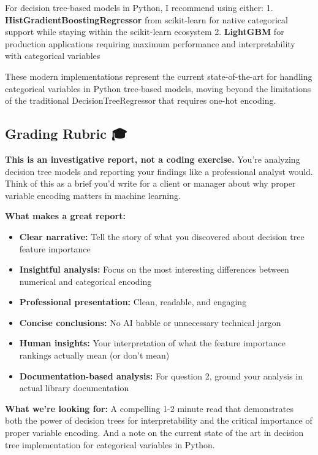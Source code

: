 \documentclass[
  letterpaper,
  DIV=11,
  numbers=noendperiod]{scrartcl}
\providecommand{\tightlist}{%
  \setlength{\itemsep}{0pt}\setlength{\parskip}{0pt}}
\begin{document}
For decision tree-based models in Python, I recommend using either: 1.
\textbf{HistGradientBoostingRegressor} from scikit-learn for native
categorical support while staying within the scikit-learn ecosystem 2.
\textbf{LightGBM} for production applications requiring maximum
performance and interpretability with categorical variables

These modern implementations represent the current state-of-the-art for
handling categorical variables in Python tree-based models, moving
beyond the limitations of the traditional DecisionTreeRegressor that
requires one-hot encoding.

\subsection{Grading Rubric 🎓}\label{grading-rubric}

\begin{tcolorbox}[enhanced jigsaw, rightrule=.15mm, coltitle=black, breakable, toprule=.15mm, bottomrule=.15mm, colback=white, colbacktitle=quarto-callout-important-color!10!white, titlerule=0mm, toptitle=1mm, colframe=quarto-callout-important-color-frame, leftrule=.75mm, arc=.35mm, left=2mm, title=\textcolor{quarto-callout-important-color}{\faExclamation}\hspace{0.5em}{📊 What You're Really Being Graded On}, bottomtitle=1mm, opacitybacktitle=0.6, opacityback=0]

\textbf{This is an investigative report, not a coding exercise.} You're
analyzing decision tree models and reporting your findings like a
professional analyst would. Think of this as a brief you'd write for a
client or manager about why proper variable encoding matters in machine
learning.

\textbf{What makes a great report:}

\begin{itemize}
\tightlist
\item
  \textbf{Clear narrative:} Tell the story of what you discovered about
  decision tree feature importance
\item
  \textbf{Insightful analysis:} Focus on the most interesting
  differences between numerical and categorical encoding
\item
  \textbf{Professional presentation:} Clean, readable, and engaging
\item
  \textbf{Concise conclusions:} No AI babble or unnecessary technical
  jargon
\item
  \textbf{Human insights:} Your interpretation of what the feature
  importance rankings actually mean (or don't mean)
\item
  \textbf{Documentation-based analysis:} For question 2, ground your
  analysis in actual library documentation
\end{itemize}

\textbf{What we're looking for:} A compelling 1-2 minute read that
demonstrates both the power of decision trees for interpretability and
the critical importance of proper variable encoding. And a note on the
current state of the art in decision tree implementation for categorical
variables in Python.

\end{tcolorbox}
\end{document}
